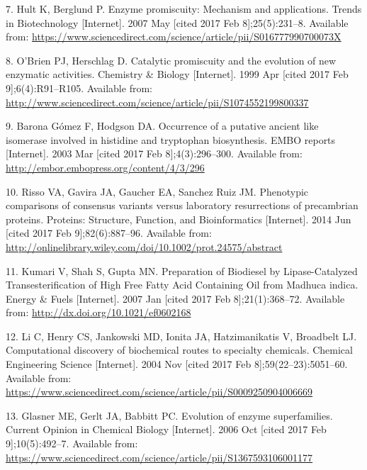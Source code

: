 \documentclass[12pt,twoside]{reedthesis}
\begin{document}
  \hypertarget{ref-hult_enzyme_2007}{}
  7. Hult K, Berglund P. Enzyme promiscuity: Mechanism and applications.
  Trends in Biotechnology {[}Internet{]}. 2007 May {[}cited 2017 Feb
  8{]};25(5):231--8. Available from:
  \url{https://www.sciencedirect.com/science/article/pii/S016777990700073X}
  
  \hypertarget{ref-obrien_catalytic_1999}{}
  8. O'Brien PJ, Herschlag D. Catalytic promiscuity and the evolution of
  new enzymatic activities. Chemistry \& Biology {[}Internet{]}. 1999 Apr
  {[}cited 2017 Feb 9{]};6(4):R91--R105. Available from:
  \url{http://www.sciencedirect.com/science/article/pii/S1074552199800337}
  
  \hypertarget{ref-baronagomez_occurrence_2003}{}
  9. Barona Gómez F, Hodgson DA. Occurrence of a putative ancient like
  isomerase involved in histidine and tryptophan biosynthesis. EMBO
  reports {[}Internet{]}. 2003 Mar {[}cited 2017 Feb 8{]};4(3):296--300.
  Available from: \url{http://embor.embopress.org/content/4/3/296}
  
  \hypertarget{ref-risso_phenotypic_2014}{}
  10. Risso VA, Gavira JA, Gaucher EA, Sanchez Ruiz JM. Phenotypic
  comparisons of consensus variants versus laboratory resurrections of
  precambrian proteins. Proteins: Structure, Function, and Bioinformatics
  {[}Internet{]}. 2014 Jun {[}cited 2017 Feb 9{]};82(6):887--96. Available
  from:
  \url{http://onlinelibrary.wiley.com/doi/10.1002/prot.24575/abstract}
  
  \hypertarget{ref-kumari_preparation_2007}{}
  11. Kumari V, Shah S, Gupta MN. Preparation of Biodiesel by
  Lipase-Catalyzed Transesterification of High Free Fatty Acid Containing
  Oil from Madhuca indica. Energy \& Fuels {[}Internet{]}. 2007 Jan
  {[}cited 2017 Feb 8{]};21(1):368--72. Available from:
  \url{http://dx.doi.org/10.1021/ef0602168}
  
  \hypertarget{ref-li_computational_2004}{}
  12. Li C, Henry CS, Jankowski MD, Ionita JA, Hatzimanikatis V, Broadbelt
  LJ. Computational discovery of biochemical routes to specialty
  chemicals. Chemical Engineering Science {[}Internet{]}. 2004 Nov
  {[}cited 2017 Feb 8{]};59(22--23):5051--60. Available from:
  \url{https://www.sciencedirect.com/science/article/pii/S0009250904006669}
  
  \hypertarget{ref-glasner_evolution_2006}{}
  13. Glasner ME, Gerlt JA, Babbitt PC. Evolution of enzyme superfamilies.
  Current Opinion in Chemical Biology {[}Internet{]}. 2006 Oct {[}cited
  2017 Feb 9{]};10(5):492--7. Available from:
  \url{https://www.sciencedirect.com/science/article/pii/S1367593106001177}
  
\end{document}
